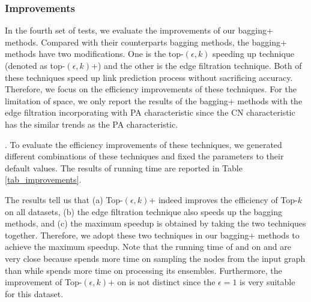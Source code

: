 \subsubsection{Improvements}
In the fourth set of tests, we evaluate the improvements of our bagging+ methods.
Compared with their counterparts bagging methods, the bagging+ methods have two modifications. 
One is the top-$(\epsilon, k)$ speeding up technique (denoted as top-$(\epsilon, k)$+)
and the other is the edge filtration technique.
Both of these techniques speed up link prediction process without sacrificing accuracy.
Therefore, we focus on the efficiency improvements of these techniques. 
For the limitation of space, we only report the results of the bagging+ methods with the edge
filtration incorporating with PA characteristic since the CN characteristic has the similar 
trends as the PA characteristic.

. To evaluate the
efficiency improvements of these techniques, we generated different combinations
of these techniques and fixed the parameters to their default values.
The results of running time are reported in Table \ref{tab_improvements}.

The results tell us that (a) Top-$(\epsilon, k)$+ indeed improves
the efficiency of Top-$k$ on all datasets,
(b) the edge filtration technique also speeds up the bagging methods,
and (c) the maximum speedup is obtained by taking the
two techniques together. Therefore, we adopt these two techniques
in our bagging+ methods to achieve the maximum speedup.
Note that the running time of \Biasedp and \Nodep on \YouTube and \Wikipedia 
are very close because \Biasedp spends more time on sampling the nodes 
from the input graph than \Nodep while \Nodep spends more time on processing 
its ensembles. Furthermore, the improvement of Top-$(\epsilon, k)$+ on \Wikipedia is not
distinct since the $\epsilon = 1$ is very suitable for this dataset.

